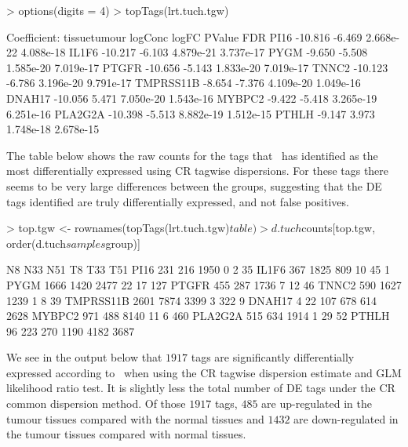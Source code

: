 \begin{Schunk}
\begin{Sinput}
> options(digits = 4)
> topTags(lrt.tuch.tgw)
\end{Sinput}
\begin{Soutput}
Coefficient: tissuetumour 
          logConc  logFC    PValue       FDR
PI16      -10.816 -6.469 2.668e-22 4.088e-18
IL1F6     -10.217 -6.103 4.879e-21 3.737e-17
PYGM       -9.650 -5.508 1.585e-20 7.019e-17
PTGFR     -10.656 -5.143 1.833e-20 7.019e-17
TNNC2     -10.123 -6.786 3.196e-20 9.791e-17
TMPRSS11B  -8.654 -7.376 4.109e-20 1.049e-16
DNAH17    -10.056  5.471 7.050e-20 1.543e-16
MYBPC2     -9.422 -5.418 3.265e-19 6.251e-16
PLA2G2A   -10.398 -5.513 8.882e-19 1.512e-15
PTHLH      -9.147  3.973 1.748e-18 2.678e-15
\end{Soutput}
\end{Schunk}

The table below shows the raw counts for the tags that \edgeR~has
identified as the most differentially expressed using CR tagwise
dispersions. For these tags there seems to be very large differences
between the groups, suggesting that the DE tags identified are truly
differentially expressed, and not false positives.

\begin{Schunk}
\begin{Sinput}
> top.tgw <- rownames(topTags(lrt.tuch.tgw)$table)
> d.tuch$counts[top.tgw, order(d.tuch$samples$group)]
\end{Sinput}
\begin{Soutput}
            N8  N33  N51   T8  T33  T51
PI16       231  216 1950    0    2   35
IL1F6      367 1825  809   10   45    1
PYGM      1666 1420 2477   22   17  127
PTGFR      455  287 1736    7   12   46
TNNC2      590 1627 1239    1    8   39
TMPRSS11B 2601 7874 3399    3  322    9
DNAH17       4   22  107  678  614 2628
MYBPC2     971  488 8140   11    6  460
PLA2G2A    515  634 1914    1   29   52
PTHLH       96  223  270 1190 4182 3687
\end{Soutput}
\end{Schunk}

We see in the output below that $1917$ tags are significantly
differentially expressed according to \edgeR~when using the CR tagwise
dispersion estimate and GLM likelihood ratio test. It is slightly less
the total number of DE tags under the CR common dispersion method. Of
those $1917$ tags, $485$ are up-regulated in the tumour tissues
compared with the normal tissues and $1432$ are down-regulated in the
tumour tissues compared with normal tissues.

